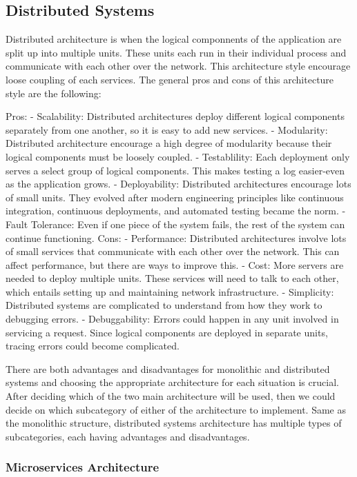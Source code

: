 \subsection[Distributed Systems]{Distributed Systems}\label{sec:newsec}
Distributed architecture is when the logical componnents of the application are split up into multiple units. 
These units each run in their individual process and communicate with each other over the network. 
This architecture style encourage loose coupling of each services. The general pros and cons of this architecture style are the following:

Pros:
-	Scalability: Distributed architectures deploy different logical components separately from one another, so it is easy to add new services.
-	Modularity: Distributed architecture encourage a high degree of modularity because their logical components must be loosely coupled.
-	Testablility: Each deployment only serves a select group of logical components. This makes testing a log easier-even as the application grows.
-	Deployability: Distributed architectures encourage lots of small units. They evolved after modern engineering principles like continuous integration, 
  continuous deployments, and automated testing became the norm.
-	Fault Tolerance: Even if one piece of the system fails, the rest of the system can continue functioning.
Cons:
-	Performance: Distributed architectures involve lots of small services that communicate with each other over the network.
  This can affect performance, but there are ways to improve this.
-	Cost: More servers are needed to deploy multiple units. These services will need to talk to each other, which entails setting up and maintaining network infrastructure.
-	Simplicity: Distributed systems are complicated to understand from how they work to debugging errors.
-	Debuggability: Errors could happen in any unit involved in servicing a request. Since logical components are deployed in separate units,
  tracing errors could become complicated.

There are both advantages and disadvantages for monolithic and distributed systems and choosing the appropriate architecture for each situation is crucial.
After deciding which of the two main architecture will be used, then we could decide on which subcategory of either of the architecture to implement.
Same as the monolithic structure, distributed systems architecture has multiple types of subcategories, each having advantages and disadvantages. 

\subsubsection[Microservices Architecture]{Microservices Architecture}

